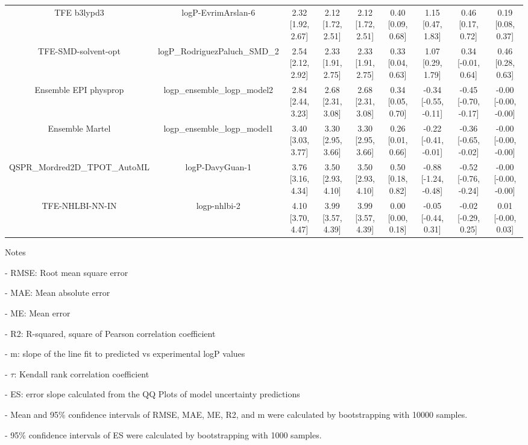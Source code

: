\documentclass{article}
\begin{document}
\begin{center}
\begin{longtable}{|ccccccccc|}
                 TFE b3lypd3 &                            logP-EvrimArslan-6 & 2.32 [1.92, 2.67] & 2.12 [1.72, 2.51] &    2.12 [1.72, 2.51] & 0.40 [0.09, 0.68] &    1.15 [0.47, 1.83] &    0.46 [0.17, 0.72] &    0.19 [0.08, 0.37] \\
         TFE-SMD-solvent-opt &                 logP\_RodriguezPaluch\_SMD\_2 & 2.54 [2.12, 2.92] & 2.33 [1.91, 2.75] &    2.33 [1.91, 2.75] & 0.33 [0.04, 0.63] &    1.07 [0.29, 1.79] &   0.34 [-0.01, 0.64] &    0.46 [0.28, 0.63] \\
       Ensemble EPI physprop &                  logp\_ensemble\_logp\_model2 & 2.84 [2.44, 3.23] & 2.68 [2.31, 3.08] &    2.68 [2.31, 3.08] & 0.34 [0.05, 0.70] & -0.34 [-0.55, -0.11] & -0.45 [-0.70, -0.17] & -0.00 [-0.00, -0.00] \\
             Ensemble Martel &                  logp\_ensemble\_logp\_model1 & 3.40 [3.03, 3.77] & 3.30 [2.95, 3.66] &    3.30 [2.95, 3.66] & 0.26 [0.01, 0.66] & -0.22 [-0.41, -0.01] & -0.36 [-0.65, -0.02] & -0.00 [-0.00, -0.00] \\
  QSPR_Mordred2D_TPOT_AutoML &                               logP-DavyGuan-1 & 3.76 [3.16, 4.34] & 3.50 [2.93, 4.10] &    3.50 [2.93, 4.10] & 0.50 [0.18, 0.82] & -0.88 [-1.24, -0.48] & -0.52 [-0.76, -0.24] & -0.00 [-0.00, -0.00] \\
             TFE-NHLBI-NN-IN &                                  logp-nhlbi-2 & 4.10 [3.70, 4.47] & 3.99 [3.57, 4.39] &    3.99 [3.57, 4.39] & 0.00 [0.00, 0.18] &  -0.05 [-0.44, 0.31] &  -0.02 [-0.29, 0.25] &   0.01 [-0.00, 0.03] \\
\end{longtable}
\end{center}

Notes

- RMSE: Root mean square error

- MAE: Mean absolute error

- ME: Mean error

- R2: R-squared, square of Pearson correlation coefficient

- m: slope of the line fit to predicted vs experimental logP values

- $\tau$:  Kendall rank correlation coefficient

- ES: error slope calculated from the QQ Plots of model uncertainty predictions

- Mean and 95\% confidence intervals of RMSE, MAE, ME, R2, and m were calculated by bootstrapping with 10000 samples.

- 95\% confidence intervals of ES were calculated by bootstrapping with 1000 samples.\end{document}
\end{document}
